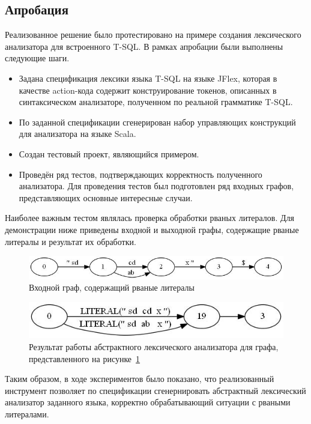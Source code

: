 \subsection{Апробация}
Реализованное решение было протестировано на примере создания лексического 
анализатора для встроенного T-SQL. В рамках апробации были выполнены следующие 
шаги. 
\begin{itemize}
    \item Задана спецификация лексики языка T-SQL на языке JFlex, которая в 
    качестве action-кода содержит конструирование токенов, описанных в 
    синтаксическом анализаторе, полученном по реальной грамматике T-SQL.
    \item По заданной спецификации сгенерирован набор управляющих конструкций 
    для анализатора на языке Scala.
    \item Создан тестовый проект, являющийся примером.
    \item Проведён ряд тестов, подтверждающих корректность полученного 
    анализатора. Для проведения тестов был подготовлен ряд входных графов, 
    представляющих основные интересные случаи.
\end{itemize}

Наиболее важным тестом являлась проверка обработки рваных литералов. Для 
демонстрации ниже приведены входной и выходной графы, содержащие рваные 
литералы и результат их обработки.
\begin{figure}[h]
 \label{Literals}
 \centering
 \includegraphics[width=15cm]{Verbitskaya/Literals_1.jpg}
 \caption{Входной граф, содержащий рваные литералы}
 \label{Literals}
\end{figure}

\begin{figure}[h]
 \label{LiteralsLex}
 \centering
 \includegraphics[width=15cm]{Verbitskaya/Literals_1_lex.jpg}
 \caption{Результат работы абстрактного лексического анализатора для графа, 
    представленного на рисунке~\ref{Literals}}
 \label{LiteralsLex}
\end{figure}

Таким образом, в ходе экспериментов было показано, что реализованный инструмент 
позволяет по спецификации сгенернировать абстрактный лексический анализатор 
заданного языка, корректно обрабатывающий ситуации с рваными литералами.



